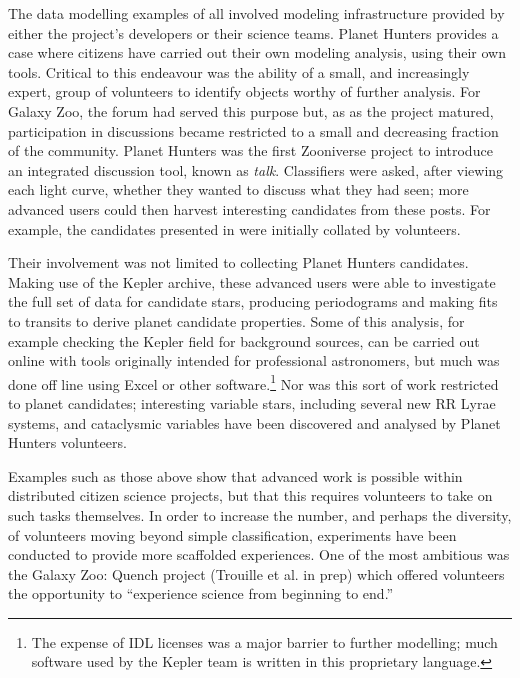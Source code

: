 \documentclass{ar2e}
\begin{document}
The data modelling examples of  all involved modeling
infrastructure provided by either the project's developers or their science
teams. Planet Hunters provides a case where citizens have carried out their own
modeling analysis, using their own tools. Critical to this endeavour was the
ability of a small,  and increasingly expert, group of volunteers to identify
objects worthy of further analysis. For Galaxy Zoo, the forum had served this
purpose but, as as the project matured, participation in discussions became
restricted to a small and decreasing fraction of the community. Planet Hunters
was the first Zooniverse project to introduce an integrated discussion tool,
known as \emph{talk}. Classifiers were asked, after viewing each light curve,
whether they wanted to discuss what they had seen; more advanced users could
then harvest interesting candidates from these posts. For example, the
candidates presented in \citet{LintottPH} were initially collated by volunteers.

Their involvement was not limited to collecting Planet Hunters candidates.
Making use of the Kepler archive, these advanced users were able to investigate
the full set of data for candidate stars, producing periodograms and making
fits  to transits to derive planet candidate properties. Some of this analysis,
for example checking the Kepler field for  background sources, can be carried
out online with tools originally intended for professional astronomers, but much
was done off line using Excel or other software.\footnote{The expense of IDL
licenses was a major barrier to further modelling; much  software used by the
Kepler team is written in this proprietary language.} Nor was this sort of work
restricted to planet candidates; interesting variable stars, including several
new RR Lyrae systems, and cataclysmic variables \citep[e.g.\ ][]{KatoOsaki} 
have been discovered and analysed by Planet Hunters volunteers. 




Examples such as those above show that advanced work is possible within
distributed citizen science projects, but that this requires volunteers to take
on such tasks themselves. In order to increase the number, and perhaps the
diversity, of volunteers moving beyond simple classification, experiments have
been conducted to provide more scaffolded experiences. One of the most ambitious
was the Galaxy Zoo: Quench project (Trouille et al. in prep) which offered
volunteers the opportunity to ``experience science from beginning to end.''
\end{document}
